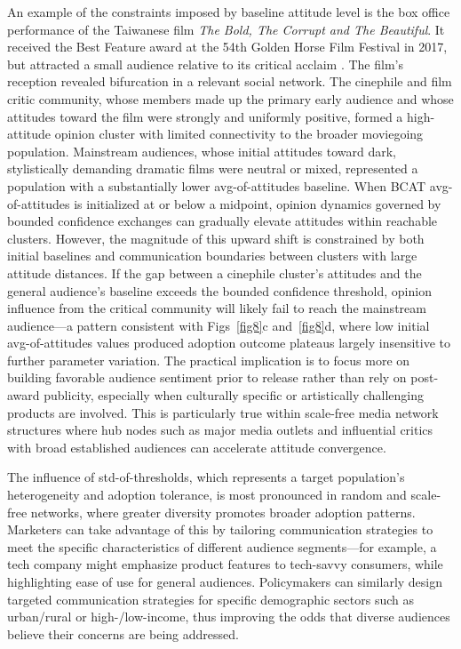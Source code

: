\documentclass[10pt,letterpaper]{article}
\begin{document}
An example of the constraints imposed by baseline attitude level is the box office performance of the Taiwanese film \textit{The Bold, The Corrupt and The Beautiful}. It received the Best Feature award at the 54th Golden Horse Film Festival in 2017, but attracted a small audience relative to its critical acclaim \cite{DeVany2001}. The film's reception revealed bifurcation in a relevant social network. The cinephile and film critic community, whose members made up the primary early audience and whose attitudes toward the film were strongly and uniformly positive, formed a high-attitude opinion cluster with limited connectivity to the broader moviegoing population. Mainstream audiences, whose initial attitudes toward dark, stylistically demanding dramatic films were neutral or mixed, represented a population with a substantially lower avg-of-attitudes baseline. When BCAT avg-of-attitudes is initialized at or below a midpoint, opinion dynamics governed by bounded confidence exchanges can gradually elevate attitudes within reachable clusters. However, the magnitude of this upward shift is constrained by both initial baselines and communication boundaries between clusters with large attitude distances. If the gap between a cinephile cluster's attitudes and the general audience's baseline exceeds the bounded confidence threshold, opinion influence from the critical community will likely fail to reach the mainstream audience---a pattern consistent with Figs~\ref{fig8}c and~\ref{fig8}d, where low initial avg-of-attitudes values produced adoption outcome plateaus largely insensitive to further parameter variation. The practical implication is to focus more on building favorable audience sentiment prior to release rather than rely on post-award publicity, especially when culturally specific or artistically challenging products are involved. This is particularly true within scale-free media network structures where hub nodes such as major media outlets and influential critics with broad established audiences can accelerate attitude convergence.

The influence of std-of-thresholds, which represents a target population's heterogeneity and adoption tolerance, is most pronounced in random and scale-free networks, where greater diversity promotes broader adoption patterns. Marketers can take advantage of this by tailoring communication strategies to meet the specific characteristics of different audience segments---for example, a tech company might emphasize product features to tech-savvy consumers, while highlighting ease of use for general audiences. Policymakers can similarly design targeted communication strategies for specific demographic sectors such as urban/rural or high-/low-income, thus improving the odds that diverse audiences believe their concerns are being addressed.
\end{document}
